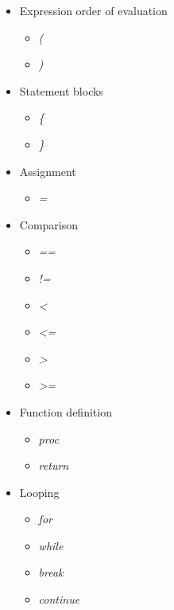 \begin{itemize}
   \item Expression order of evaluation
      \begin{itemize}
          \item \emph{(}
          \item \emph{)}
      \end{itemize}
   \item Statement blocks
      \begin{itemize}
          \item \emph{\{}
          \item \emph{\}}
      \end{itemize}
   \item Assignment
      \begin{itemize}
          \item \emph{=}
      \end{itemize}
   \item Comparison
      \begin{itemize}
          \item \emph{==}
          \item \emph{!=}
          \item \emph{\textless}
          \item \emph{\textless{}=}
          \item \emph{\textgreater}
          \item \emph{\textgreater{}=}
      \end{itemize}
   \item Function definition
      \begin{itemize}
          \item \emph{proc}
          \item \emph{return}
      \end{itemize}
   \item Looping
      \begin{itemize}
          \item \emph{for}
          \item \emph{while}
          \item \emph{break}
          \item \emph{continue}
      \end{itemize}
\end{itemize}


